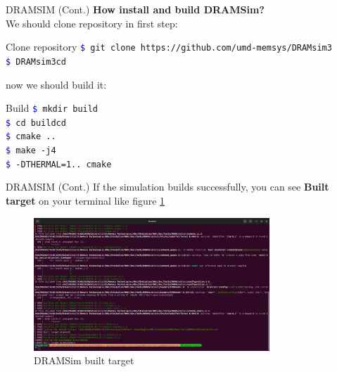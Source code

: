 \documentclass{beamer}
\begin{document}
\begin{frame}{DRAMSIM (Cont.)}
	\textbf{How install and build DRAMSim?}\\
	We should clone repository in first step:
	\begin{block}{Clone repository}
		\texttt{\textcolor{blue}{\$} git clone ‫‪https://github.com/umd-memsys/DRAMsim3‬‬} \\
		\texttt{\textcolor{blue}{\$} ‫‪DRAMsim3‬‬‫‪cd‬‬} \\
	\end{block}
	
	now we should build it:
	\begin{block}{Build}
		\texttt{\textcolor{blue}{\$} mkdir build‬‬} \\
		\texttt{\textcolor{blue}{\$} ‫‪cd build‬‬‫‪cd‬‬} \\
		\texttt{\textcolor{blue}{\$} ‫‪cmake ..‬‬} \\
		\texttt{\textcolor{blue}{\$} ‫‪make -j4‬‬} \\
		\texttt{\textcolor{blue}{\$} ‫‪‫‪-DTHERMAL=1‬‬‫‪..‬‬ ‫‪cmake‬‬‬‬} \\
	\end{block}
\end{frame}




\begin{frame}{DRAMSIM (Cont.)}
	If the simulation builds successfully, you can see \textbf{Built target} on your terminal like figure \ref{fig:DRAMSim built target}
	
	\begin{figure}
		\centering
		\includegraphics[height=5cm]{images/img12}
		\caption{DRAMSim built target}
		\label{fig:DRAMSim built target}
	\end{figure}
\end{frame}
\end{document}
